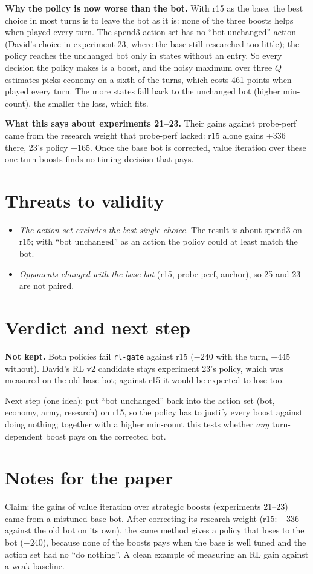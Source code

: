 \documentclass{../polyexp}
\begin{document}
\textbf{Why the policy is now worse than the bot.} With r15 as the base, the best choice in most turns is to leave the
bot as it is: none of the three boosts helps when played every turn. The spend3 action set has no ``bot unchanged''
action (David's choice in experiment 23, where the base still researched too little); the policy reaches the
unchanged bot only in states without an entry. So every decision the policy makes is a boost, and the noisy
maximum over three $Q$ estimates picks economy on a sixth of the turns, which costs 461 points when played every
turn. The more states fall back to the unchanged bot (higher min-count), the smaller the loss, which fits.

\textbf{What this says about experiments 21--23.} Their gains against probe-perf came from the research weight that
probe-perf lacked: r15 alone gains +336 there, 23's policy +165. Once the base bot is corrected, value iteration over
these one-turn boosts finds no timing decision that pays.


\section{Threats to validity}
\begin{itemize}
  \item \emph{The action set excludes the best single choice.} The result is about spend3 on r15; with ``bot
        unchanged'' as an action the policy could at least match the bot.
  \item \emph{Opponents changed with the base bot} (r15, probe-perf, anchor), so 25 and 23 are not paired.
\end{itemize}

\section{Verdict and next step}
\textbf{Not kept.} Both policies fail \texttt{rl-gate} against r15 ($-240$ with the turn, $-445$ without). David's RL v2
candidate stays experiment 23's policy, which was measured on the old base bot; against r15 it would be expected to
lose too.

Next step (one idea): put ``bot unchanged'' back into the action set (bot, economy, army, research) on r15, so the
policy has to justify every boost against doing nothing; together with a higher min-count this tests whether
\emph{any} turn-dependent boost pays on the corrected bot.

\section{Notes for the paper}
Claim: the gains of value iteration over strategic boosts (experiments 21--23) came from a mistuned base bot. After
correcting its research weight (r15: +336 against the old bot on its own), the same method gives a policy that loses
to the bot ($-240$), because none of the boosts pays when the base is well tuned and the action set had no ``do
nothing''. A clean example of measuring an RL gain against a weak baseline.

\end{document}
